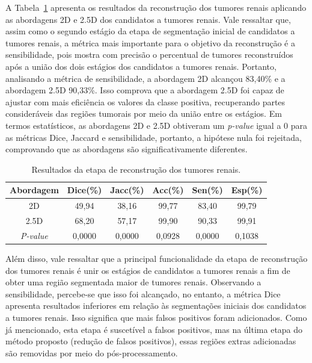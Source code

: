 A Tabela~\ref{tab:recons-tumores-renais} apresenta os resultados da reconstrução dos tumores renais aplicando as abordagens 2D e 2.5D dos candidatos a tumores renais. Vale ressaltar que, assim como o segundo estágio da etapa de segmentação inicial de candidatos a tumores renais, a métrica mais importante para o objetivo da reconstrução é a sensibilidade, pois mostra com precisão o percentual de tumores reconstruídos após a união dos dois estágios dos candidatos a tumores renais. Portanto, analisando a métrica de sensibilidade, a abordagem 2D alcançou 83,40\% e a abordagem 2.5D 90,33\%. Isso comprova que a abordagem 2.5D foi capaz de ajustar com mais eficiência os valores da classe positiva, recuperando partes consideráveis das regiões tumorais por meio da união entre os estágios. Em termos estatísticos, as abordagens 2D e 2.5D obtiveram um \textit{p-value} igual a 0 para as métricas Dice, Jaccard e sensibilidade, portanto, a hipótese nula foi rejeitada, comprovando que as abordagens são significativamente diferentes.

\begin{table}[!ht]
\caption{Resultados da etapa de reconstrução dos tumores renais.}
\label{tab:recons-tumores-renais}
\centering
\begin{tabular}{c|c|c|c|c|c}
\hline
Abordagem           & Dice(\%)                      & Jacc(\%)                      & Acc(\%) & Sen(\%)                       & Esp(\%) \\ \hline
2D       & 49,94                          & 38,16                          & 99,77    & 83,40                          & 99,79    \\ \hline
2.5D     & 68,20                          & 57,17                          & 99,90    & 90,33                          & 99,91    \\ \hline
\textit{P-value} & \cellcolor[HTML]{C0C0C0}0,0000 & \cellcolor[HTML]{C0C0C0}0,0000 & 0,0928   & \cellcolor[HTML]{C0C0C0}0,0000 & 0,1038   \\ \hline
\end{tabular}
\end{table}

Além disso, vale ressaltar que a principal funcionalidade da etapa de reconstrução dos tumores renais é unir os estágios de candidatos a tumores renais a fim de obter uma região segmentada maior de tumores renais. Observando a sensibilidade, percebe-se que isso foi alcançado, no entanto, a métrica Dice apresenta resultados inferiores em relação às segmentações iniciais dos candidatos a tumores renais. Isso significa que mais falsos positivos foram adicionados. Como já mencionado, esta etapa é suscetível a falsos positivos, mas na última etapa do método proposto (redução de falsos positivos), essas regiões extras adicionadas são removidas por meio do pós-processamento.

